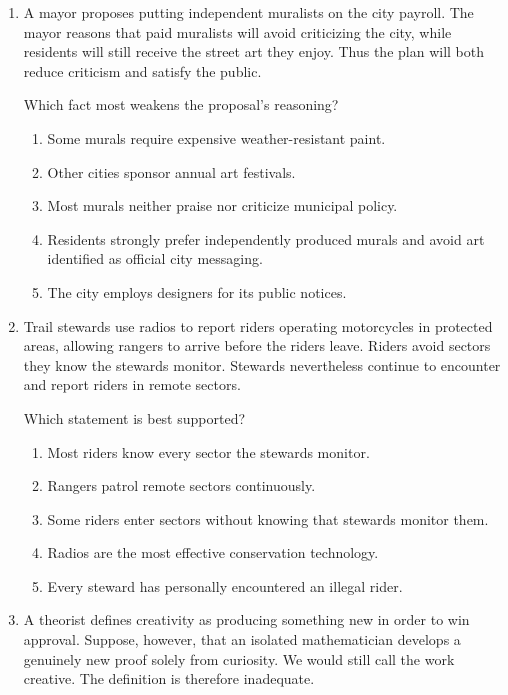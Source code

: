 \begin{enumerate}
\item A mayor proposes putting independent muralists on the city payroll. The mayor reasons that paid muralists will avoid criticizing the city, while residents will still receive the street art they enjoy. Thus the plan will both reduce criticism and satisfy the public.

Which fact most weakens the proposal's reasoning?
\begin{enumerate}
\item Some murals require expensive weather-resistant paint.
\item Other cities sponsor annual art festivals.
\item Most murals neither praise nor criticize municipal policy.
\item Residents strongly prefer independently produced murals and avoid art identified as official city messaging.
\item The city employs designers for its public notices.
\end{enumerate}

\item Trail stewards use radios to report riders operating motorcycles in protected areas, allowing rangers to arrive before the riders leave. Riders avoid sectors they know the stewards monitor. Stewards nevertheless continue to encounter and report riders in remote sectors.

Which statement is best supported?
\begin{enumerate}
\item Most riders know every sector the stewards monitor.
\item Rangers patrol remote sectors continuously.
\item Some riders enter sectors without knowing that stewards monitor them.
\item Radios are the most effective conservation technology.
\item Every steward has personally encountered an illegal rider.
\end{enumerate}

\item A theorist defines creativity as producing something new in order to win approval. Suppose, however, that an isolated mathematician develops a genuinely new proof solely from curiosity. We would still call the work creative. The definition is therefore inadequate.


\end{enumerate}
